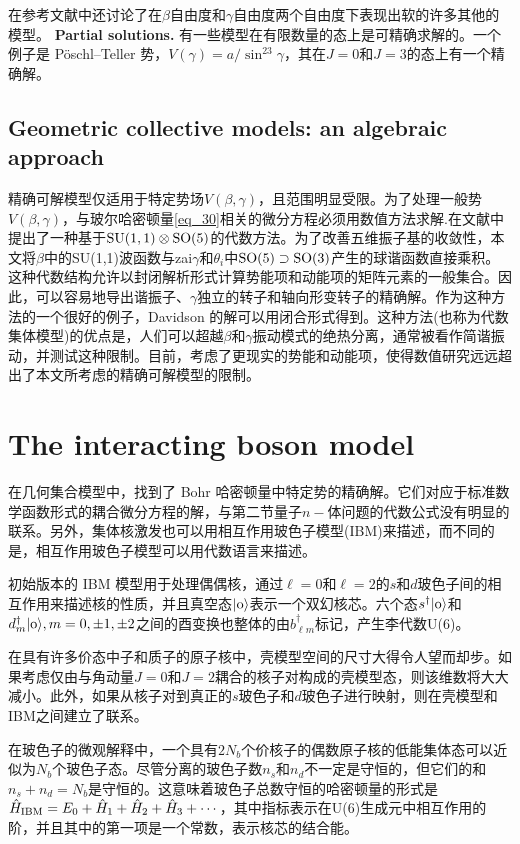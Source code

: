 在参考文献中还讨论了在$\beta$自由度和$\gamma$自由度两个自由度下表现出软的许多其他的模型。
\vskip 0.6cm
\noindent\textbf{\large Partial solutions.}
\vskip 0.3cm
有一些模型在有限数量的态上是可精确求解的。一个例子是 P\"{o}schl–Teller 势，$V(\gamma)=a/\sin^23\gamma$，其在$J=0$和$J=3$的态上有一个精确解。

\subsection{Geometric collective models: an algebraic approach}

精确可解模型仅适用于特定势场$V(\beta,\gamma)$，且范围明显受限。为了处理一般势$V(\beta,\gamma)$，与玻尔哈密顿量\ref{eq_30}相关的微分方程必须用数值方法求解.在文献中提出了一种基于${\rm SU}(1,1)\otimes{\rm SO}(5)$的代数方法。为了改善五维振子基的收敛性，本文将$\beta$中的SU(1,1)波函数与zai$\gamma$和$\theta_i$中${\rm SO}(5)\supset{\rm SO}(3)$产生的球谐函数直接乘积。这种代数结构允许以封闭解析形式计算势能项和动能项的矩阵元素的一般集合。因此，可以容易地导出谐振子、$\gamma$独立的转子和轴向形变转子的精确解。作为这种方法的一个很好的例子，Davidson 的解可以用闭合形式得到。这种方法(也称为代数集体模型)的优点是，人们可以超越$\beta$和$\gamma$振动模式的绝热分离，通常被看作简谐振动，并测试这种限制。目前，考虑了更现实的势能和动能项，使得数值研究远远超出了本文所考虑的精确可解模型的限制。

\section{The interacting boson model}

在几何集合模型中，找到了 Bohr 哈密顿量中特定势的精确解。它们对应于标准数学函数形式的耦合微分方程的解，与第二节量子$n-$体问题的代数公式没有明显的联系。另外，集体核激发也可以用相互作用玻色子模型(IBM)来描述，而不同的是，相互作用玻色子模型可以用代数语言来描述。

初始版本的 IBM 模型用于处理偶偶核，通过$\ell=0$和$\ell=2$的$s$和$d$玻色子间的相互作用来描述核的性质，并且真空态$|{\rm o}\rangle$表示一个双幻核芯。六个态$s^\dagger|{\rm o}\rangle$和$d^\dagger_m|{\rm o}\rangle,m=0,\pm1,\pm2$之间的酉变换也整体的由$b^\dag_{\ell m}$标记，产生李代数U(6)。

在具有许多价态中子和质子的原子核中，壳模型空间的尺寸大得令人望而却步。如果考虑仅由与角动量$J=0$和$J=2$耦合的核子对构成的壳模型态，则该维数将大大减小。此外，如果从核子对到真正的$s$玻色子和$d$玻色子进行映射，则在壳模型和IBM之间建立了联系。

在玻色子的微观解释中，一个具有$2N_b$个价核子的偶数原子核的低能集体态可以近似为$N_b$个玻色子态。尽管分离的玻色子数$n_s$和$n_d$不一定是守恒的，但它们的和$n_s+n_d=N_b$是守恒的。这意味着玻色子总数守恒的哈密顿量的形式是$\hat H_{\rm IBM}=E_0+\hat H_1+\hat H_2+\hat H_3+\cdots$，其中指标表示在U(6)生成元中相互作用的阶，并且其中的第一项是一个常数，表示核芯的结合能。


